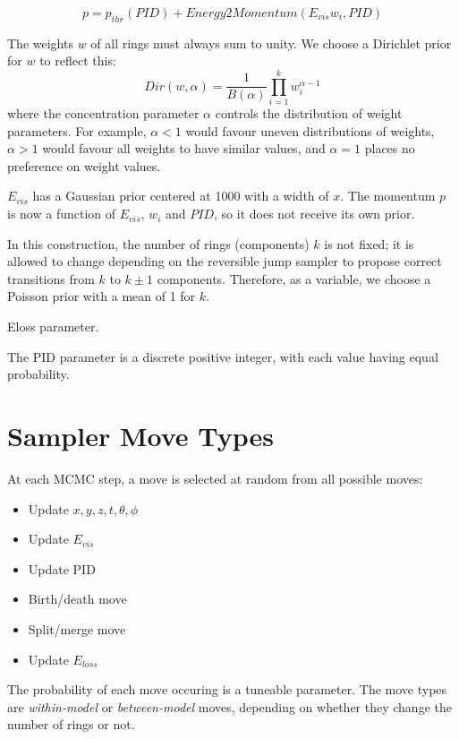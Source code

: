 \documentclass[11pt]{article} %
\begin{document}
\begin{equation}
p = p_{thr}(PID) + Energy2Momentum(E_{vis}w_{i}, PID)
\end{equation}

The weights $w$ of all rings must always sum to unity. We choose a Dirichlet prior for $w$ to reflect this:
\begin{equation}
Dir(w,\alpha) = \frac{1}{B(\alpha)} \prod_{i=1}^{k}w_{i}^{\alpha-1}
\end{equation}
where the concentration parameter $\alpha$ controls the distribution of weight parameters. For example, $\alpha < 1$ would favour uneven distributions of weights, $\alpha>1$ would favour all weights to have similar values, and $\alpha=1$ places no preference on weight values.

 $E_{vis}$ has a Gaussian prior centered at 1000 with a width of $x$. The momentum $p$ is now a function of $E_{vis}$, $w_{i}$ and $PID$, so it does not receive its own prior.

In this construction, the number of rings (components) $k$ is not fixed; it is allowed to change depending on the reversible jump sampler to propose correct transitions from $k$ to $k\pm1$ components. Therefore, as a variable, we choose a Poisson prior with a mean of 1 for $k$.

Eloss parameter.

The PID parameter is a discrete positive integer, with each value having equal probability.

\section{Sampler Move Types}
At each MCMC step, a move is selected at random from all possible moves:

\begin{itemize}
\item Update $x,y,z,t,\theta,\phi$
\item Update $E_{vis}$
\item Update PID
\item Birth/death move
\item Split/merge move
\item Update $E_{loss}$
\end{itemize}

The probability of each move occuring is a tuneable parameter. The move types are \emph{within-model} or \emph{between-model} moves, depending on whether they change the number of rings or not.
\end{document}
